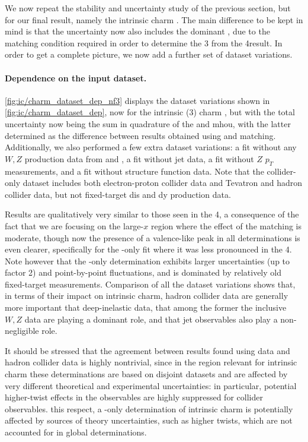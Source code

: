 
We now repeat the stability and uncertainty
study of the previous section, but for our final
result, namely the intrinsic charm \pdf. The main difference to be kept
in mind is that the uncertainty now also includes the dominant \mhou,
due to the matching condition required in order to determine the 3\fns
\pdf from the 4\fns result. In order to get a complete picture, we now
add a further set of dataset variations.

\paragraph{Dependence on the input dataset.}
%
\cref{fig:ic/charm_dataset_dep_nf3} displays the dataset variations shown in
\cref{fig:ic/charm_dataset_dep}, now for the intrinsic (3\fns) charm \pdf, but
with the total uncertainty now being the sum in quadrature of the \pdf and
\acrlong{mhou}, with the latter determined as the difference between results
obtained using \nnlo and \nnnlo matching.
%
Additionally, we also performed a few extra  dataset
variations: a fit without any $W, Z$ production data from \atlas and \cms,
a fit without jet data, a fit without $Z$ $p_T$ measurements, and a fit without
\hera structure function data.
%
Note that the collider-only dataset includes both \hera electron-proton collider
data and Tevatron and \lhc hadron collider data, but not fixed-target
\acrlong{dis} and \acrlong{dy} production data.

Results are qualitatively very similar to those seen in the 4\fns, a
consequence of the fact that we are focusing on the large-$x$ region where the
effect of the matching is moderate, though now the presence of a
valence-like peak in all determinations is even clearer, specifically
for the \dis-only fit where it was less pronounced in the 4\fns.
%
Note however that the \dis-only determination exhibits larger uncertainties
(up to factor 2) and point-by-point fluctuations, and is dominated by
relatively old fixed-target measurements.
%
Comparison of all the dataset variations shows that, in terms of their impact
on intrinsic charm, hadron collider data are generally more important that
deep-inelastic data, that among the former the \lhcb inclusive $W,Z$ data are
playing a dominant role, and that jet observables also play a non-negligible
role.

It should be stressed that the agreement between results found using \dis data
and hadron collider data is highly nontrivial, since in the region relevant for
intrinsic charm these determinations are based on disjoint datasets and are 
affected by very different theoretical and experimental uncertainties: in
particular, potential higher-twist effects in the \dis observables are highly
suppressed for collider observables.
%
this respect, a \dis-only determination of intrinsic charm
is potentially affected by sources of theory uncertainties, such as higher
twists, which are not accounted for in global \pdf determinations.

